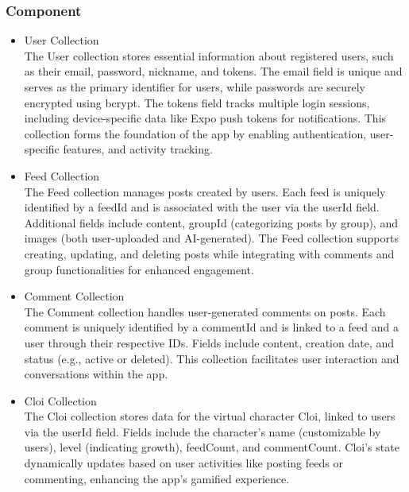 \documentclass[conference]{IEEEtran}
\begin{document}
        \subsubsection{Component}
            \begin{itemize}
                \item User Collection\\
                The User collection stores essential information about registered users, such as their email, password, nickname, and tokens. The email field is unique and serves as the primary identifier for users, while passwords are securely encrypted using bcrypt. The tokens field tracks multiple login sessions, including device-specific data like Expo push tokens for notifications. This collection forms the foundation of the app by enabling authentication, user-specific features, and activity tracking.
                \vspace{3mm}
                \item Feed Collection\\
                The Feed collection manages posts created by users. Each feed is uniquely identified by a feedId and is associated with the user via the userId field. Additional fields include content, groupId (categorizing posts by group), and images (both user-uploaded and AI-generated). The Feed collection supports creating, updating, and deleting posts while integrating with comments and group functionalities for enhanced engagement.
                \vspace{3mm}                
                \item Comment Collection\\
                The Comment collection handles user-generated comments on posts. Each comment is uniquely identified by a commentId and is linked to a feed and a user through their respective IDs. Fields include content, creation date, and status (e.g., active or deleted). This collection facilitates user interaction and conversations within the app.
                \vspace{3mm}                
                \item Cloi Collection\\
                The Cloi collection stores data for the virtual character Cloi, linked to users via the userId field. Fields include the character's name (customizable by users), level (indicating growth), feedCount, and commentCount. Cloi's state dynamically updates based on user activities like posting feeds or commenting, enhancing the app's gamified experience.

\end{itemize}
\end{document}
